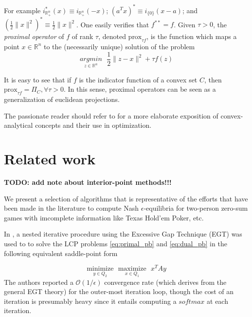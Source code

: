 \documentclass[12pt]{article}
\begin{document}
For example $i_{\mathbb{R}^{n}_+}^*(x) \equiv i_{\mathbb{R}^{n}_+}(-x)$; $(a^Tx)^* \equiv i_{\{0\}}(x - a)$; and $(\frac{1}{2}\|x\|^2)^* \equiv \frac{1}{2}\|x\|^2$. One easily verifies that $f^{**} = f$. Given $\tau > 0$, the \textit{proximal operator} of $f$ of rank
$\tau$, denoted $\text{prox}_{\tau f}$, is the function which maps a point $x \in \mathbb{R}^n$ to the (necessarily
unique) solution of the problem
\begin{equation}
  \underset{z \in \mathbb{R}^n}{argmin}\text{ }\frac{1}{2}\|z - x\|^2 + \tau f(z)
\end{equation}

It is easy to see that if $f$ is the indicator function of a convex set $C$, then $\text{prox}_{\tau f} = \Pi_C, \forall \tau > 0$. In this sense, proximal operators can be seen
as a generalization of euclidean projections. 

The passionate reader should refer to \cite{rockafellar1997convex, combettes2011proximal} for a more elaborate exposition of convex-analytical concepts and their use in optimization.


\section{Related work}
\label{sec:related_work}
\textbf{TODO: add note about interior-point methods!!!}

We present a selection of algorithms that is representative of the efforts that have been made in the literature to compute Nash $\epsilon$-equilibria for two-person zero-sum games with imcomplete information like Texas Hold'em Poker, etc.

In \cite{hoda2010smoothing}, a nested iterative procedure using the Excessive Gap Technique (EGT) \cite{nesterov2005excessive} was used to to solve the LCP problems \eqref{eq:primal_pb} and \eqref{eq:dual_pb} in the following equivalent saddle-point form

\begin{equation}
  \underset{y \in Q_2}{\text{minimize}}\text{ }\underset{x \in Q_1}{\text{maximize}}\text{ }x^TAy
  \label{eq:gilpin}
\end{equation}
The authors reported a $\mathcal{O}(1/\epsilon)$ convergence rate (which derives from the general EGT theory) for the outer-most iteration loop, though the cost of an iteration is presumably heavy since it entails computing a $softmax$ at each iteration.
\end{document}
